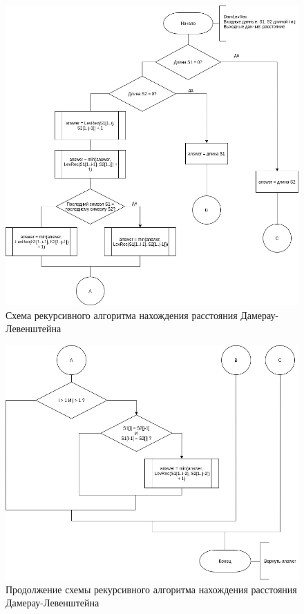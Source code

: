 \begin{figure}[h]
	\centering
	\includegraphics[scale=0.58]{schemes/DamLevRecTop.jpg}
	\caption{Схема рекурсивного алгоритма нахождения расстояния Дамерау-Левенштейна}
	\label{scheme:damlevrectop}
\end{figure}

\begin{figure}[h]
	\centering
	\includegraphics[scale=0.6]{schemes/DamLevRecBottom.jpg}
	\caption{Продолжение схемы рекурсивного алгоритма нахождения расстояния Дамерау-Левенштейна}
	\label{scheme:damlevrecbottom}
\end{figure}

